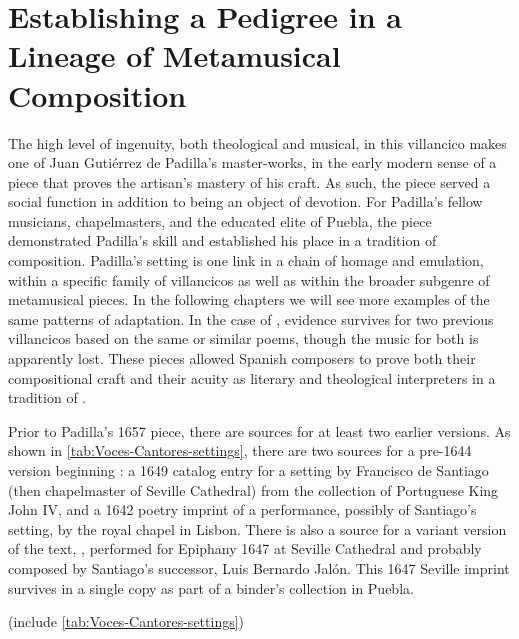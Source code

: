 \section{Establishing a Pedigree in a Lineage of Metamusical Composition}

The high level of ingenuity, both theological and musical, in this villancico
makes  one of Juan Gutiérrez de Padilla's
master-works, in the early modern sense of a piece that proves the artisan's
mastery of his craft.
As such, the piece served a social function in addition to being an object of
devotion.
For Padilla's fellow musicians, chapelmasters, and the educated elite of Puebla,
the piece demonstrated Padilla's skill and established his place in a tradition
of composition.
Padilla's setting is one link in a chain of homage and emulation, within a
specific family of villancicos as well as within the broader subgenre of
metamusical pieces.
In the following chapters we will see more examples of the same patterns of
adaptation.
In the case of , evidence survives for two previous
villancicos based on the same or similar poems, though the music for both is
apparently lost.
These pieces allowed Spanish composers to prove both their compositional craft
and their acuity as literary and theological interpreters in a tradition of
.

Prior to Padilla's 1657 piece, there are sources for at least two earlier
versions. 
As shown in \cref{tab:Voces-Cantores-settings}, there are two
sources for a pre-1644 version beginning : a 1649
catalog entry for a setting by Francisco de Santiago (then chapelmaster of
Seville Cathedral) from the collection of Portuguese King John IV, and a
1642 poetry imprint of a performance, possibly of Santiago's setting, by the
royal chapel in Lisbon.
There is also a source for a variant version of the text, , performed for Epiphany 1647 at Seville Cathedral and probably composed
by Santiago's successor, Luis Bernardo Jalón.
This 1647 Seville imprint survives in a single copy as part of a binder's
collection in Puebla.

(include \cref{tab:Voces-Cantores-settings})
\label{tab:Voces-Cantores-settings}

